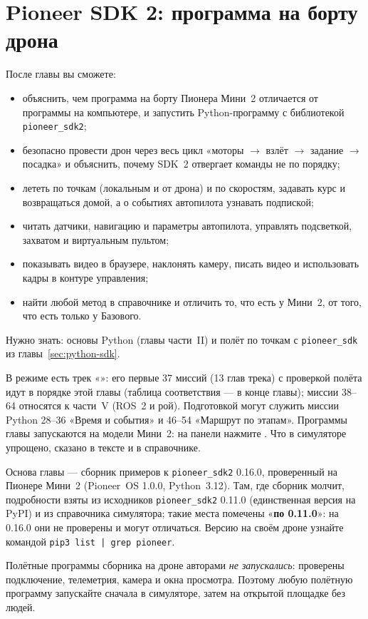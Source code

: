 \section{Pioneer SDK 2: программа на борту дрона}
\label{sec:sdk2}

\begin{infobox}
После главы вы сможете:
\begin{itemize}
    \item объяснить, чем программа на борту Пионера Мини~2 отличается от программы на компьютере, и запустить Python-программу с библиотекой \texttt{pioneer\_sdk2};
    \item безопасно провести дрон через весь цикл «моторы $\to$ взлёт $\to$ задание $\to$ посадка» и объяснить, почему SDK~2 отвергает команды не по порядку;
    \item лететь по точкам (локальным и от дрона) и по скоростям, задавать курс и возвращаться домой, а о событиях автопилота узнавать подпиской;
    \item читать датчики, навигацию и параметры автопилота, управлять подсветкой, захватом и виртуальным пультом;
    \item показывать видео в браузере, наклонять камеру, писать видео и использовать кадры в контуре управления;
    \item найти любой метод в справочнике и отличить то, что есть у Мини~2, от того, что есть только у Базового.
\end{itemize}
Нужно знать: основы Python (главы части~II) и полёт по точкам с \texttt{pioneer\_sdk} из главы~\ref{sec:python-sdk}.
\end{infobox}

\begin{missionbox}
В режиме  есть трек «»: его первые 37 миссий (13 глав трека) с проверкой полёта идут в порядке этой главы (таблица соответствия --- в конце главы); миссии 38--64 относятся к части~V (ROS~2 и рой). Подготовкой могут служить миссии Python 28--36 «Время и события» и 46--54 «Маршрут по этапам». Программы главы запускаются на модели Мини~2: на панели  нажмите . Что в симуляторе упрощено, сказано в тексте и в справочнике.
\end{missionbox}

\begin{infobox}
Основа главы --- сборник примеров к \texttt{pioneer\_sdk2} 0.16.0, проверенный на Пионере Мини~2 (Pioneer~OS 1.0.0, Python~3.12). Там, где сборник молчит, подробности взяты из исходников \texttt{pioneer\_sdk2} 0.11.0 (единственная версия на PyPI) и из справочника симулятора; такие места помечены «\textbf{по 0.11.0}»: на 0.16.0 они не проверены и могут отличаться. Версию на своём дроне узнайте командой \verb!pip3 list | grep pioneer!.

Полётные программы сборника на дроне авторами \emph{не запускались}: проверены подключение, телеметрия, камера и окна просмотра. Поэтому любую полётную программу запускайте сначала в симуляторе, затем на открытой площадке без людей.
\end{infobox}

